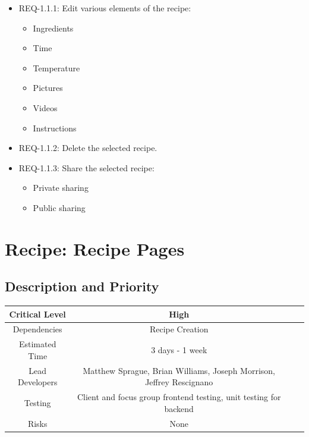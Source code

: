 \documentclass{scrreprt}
\begin{document}
\begin{itemize}
    \item REQ-1.1.1: Edit various elements of the recipe:
        \begin{itemize}
            \item Ingredients
            \item Time
            \item Temperature
            \item Pictures
            \item Videos
            \item Instructions
        \end{itemize}
    \item REQ-1.1.2: Delete the selected recipe.
    \item REQ-1.1.3: Share the selected recipe:
        \begin{itemize}
            \item Private sharing
            \item Public sharing
        \end{itemize}
\end{itemize}

\section{Recipe: Recipe Pages}

\subsection{Description and Priority}
\begin{center}
    \begin{tabular}{| c | c | c | c |}
        \hline
        Critical Level & High \\
        \hline
        Dependencies & Recipe Creation \\
        \hline
        Estimated Time & 3 days - 1 week \\
        \hline
        Lead Developers & Matthew Sprague, Brian Williams, Joseph Morrison, Jeffrey Rescignano \\
        \hline
        Testing & Client and focus group frontend testing, unit testing for backend \\
        \hline
        Risks & None \\
        \hline
    \end{tabular}
\end{center}
\end{document}
